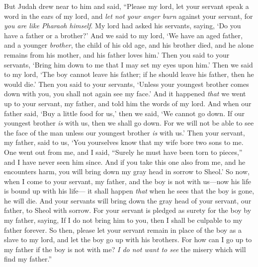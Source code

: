 \begin{biblechapter}
\verse But Judah drew near to him and said, “Please my lord, let your servant speak a word in the ears of my lord, and \textit{let not your anger burn} against your servant, for \textit{you are like Pharaoh himself}.
\verse My lord had asked his servants, saying, ‘Do you have a father or a brother?’
\verse And we said to my lord, ‘We have an aged father, and a younger \textit{brother}, the child of his old age, and his brother died, and he alone remains from his mother, and his father loves him.’
\verse Then you said to your servants, ‘Bring him down to me that I may set my eyes upon him.’
\verse Then we said to my lord, ‘The boy cannot leave his father; if he should leave his father, then he would die.’
\verse Then you said to your servants, ‘Unless your youngest brother comes down with you, you shall not again see my face.’
\verse And it happened \textit{that} we went up to your servant, my father, and told him the words of my lord.
\verse And when our father said, ‘Buy a little food for us,’
\verse then we said, ‘We cannot go down. If our youngest brother \textit{is} with us, then we shall go down. For we will not be able to see the face of the man unless our youngest brother \textit{is} with us.’
\verse Then your servant, my father, said to us, ‘You yourselves know that my wife bore two sons to me.
\verse One went out from me, and I said, “Surely he must have been torn to pieces,” and I have never seen him since.
\verse And if you take this one also from me, and he encounters harm, you will bring down my gray head in sorrow to Sheol.’
\verse So now, when I come to your servant, my father, and the boy is not with us—now his life is bound up with his life—
\verse it shall happen \textit{that} when he sees that the boy is gone, he will die. And your servants will bring down the gray head of your servant, our father, to Sheol with sorrow.
\verse For your servant is pledged as surety for the boy by my father, saying, If I do not bring him to you, then I shall be culpable to my father forever.
\verse So then, please let your servant remain in place of the boy as a slave to my lord, and let the boy go up with his brothers.
\verse For how can I go up to my father if the boy is not with me? \textit{I do not want to see} the misery which will find my father.”
\end{biblechapter}

